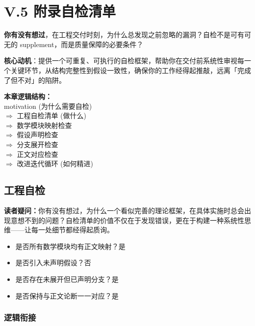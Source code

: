 \documentclass[../main.tex]{subfiles}
\begin{document}
\chapter{V.5 附录自检清单}

\begin{motivation}
	\textbf{你有没有想过}，在工程交付时刻，为什么总发现之前忽略的漏洞？自检不是可有可无的 supplement，而是质量保障的必要条件？

	\textbf{核心动机}：提供一个可重复、可执行的自检框架，帮助你在交付前系统性审视每一个关键环节，从结构完整性到假设一致性，确保你的工作经得起推敲，远离「完成了但不对」的陷阱。
\end{motivation}

\begin{logicmap}
	\textbf{本章逻辑结构：} \\
	\indent motivation (为什么需要自检) \\
	\quad $\Rightarrow$ 工程自检清单 (做什么) \\
	\quad \indent $\Rightarrow$ 数学模块映射检查 \\
	\quad \indent $\Rightarrow$ 假设声明检查 \\
	\quad \indent $\Rightarrow$ 分支展开检查 \\
	\quad \indent $\Rightarrow$ 正文对应检查 \\
		\quad $\Rightarrow$ 改进迭代循环 (如何精进)
\end{logicmap}

\section{工程自检}

\textbf{读者疑问：}你有没有想过，为什么一个看似完善的理论框架，在具体实施时总会出现意想不到的问题？自检清单的价值不仅在于发现错误，更在于构建一种系统性思维——让每一处细节都经得起质询。

\begin{itemize}
	\item 是否所有数学模块均有正文映射？\quad 是
	\item 是否引入未声明假设？\quad 否
	\item 是否存在未展开但已声明分支？\quad 是
	\item 是否保持与正文论断一一对应？\quad 是
\end{itemize}

\subsection{逻辑衔接}
\end{document}
